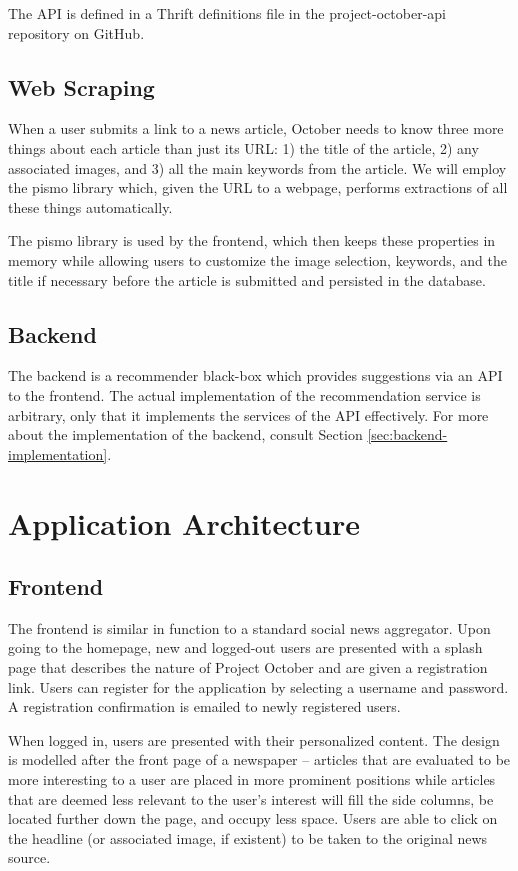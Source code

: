 \documentclass[11pt,letterpaper]{article}
\begin{document}
The API is defined in a Thrift definitions file in the project-october-api repository on GitHub\cite{project-october-api}.

\subsection{Web Scraping}
\label{sec:scraping}
When a user submits a link to a news article, October needs to know three more things about each article than just its URL: 1) the title of the article, 2) any associated images, and 3) all the main keywords from the article.
We will employ the pismo library\cite{pismo} which, given the URL to a webpage, performs extractions of all these things automatically.

The pismo library is used by the frontend, which then keeps these properties in memory while allowing users to customize the image selection, keywords, and the title if necessary before the article is submitted and persisted in the database.

\subsection{Backend} %
The backend is a recommender black-box which provides suggestions via an API to the frontend.
The actual implementation of the recommendation service is arbitrary, only that it implements the services of the API effectively.
For more about the implementation of the backend, consult Section \ref{sec:backend-implementation}.

\section{Application Architecture}
\subsection{Frontend}
The frontend is similar in function to a standard social news aggregator.
Upon going to the homepage, new and logged-out users are presented with a splash page that describes the nature of Project October and are given a registration link.
Users can register for the application by selecting a username and password.
A registration confirmation is emailed to newly registered users.

When logged in, users are presented with their personalized content.
The design is modelled after the front page of a newspaper -- articles that are evaluated to be more interesting to a user are placed in more prominent positions while articles that are deemed less relevant to the user's interest will fill the side columns, be located further down the page, and occupy less space.
Users are able to click on the headline (or associated image, if existent) to be taken to the original news source.
\end{document}
